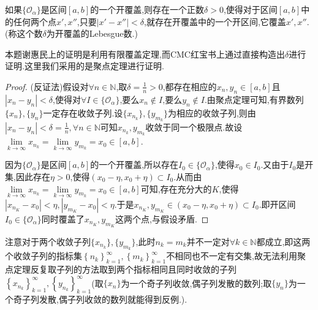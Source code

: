 \documentclass[../../main.tex]{subfiles}%
\begin{document}
\begin{lemma}[Lebesgue数引理]\label{lemma:Lebesgue数引理}
如果\(\{\mathcal{O}_{\alpha}\}\)是区间\([a,b]\)的一个开覆盖,则存在一个正数\(\delta>0\),使得对于区间\([a,b]\)中的任何两个点\(x',x''\),只要\(\vert x' - x''\vert<\delta\),就存在开覆盖中的一个开区间,它覆盖\(x',x''\).(称这个数\(\delta\)为开覆盖的Lebesgue数.)
\end{lemma}
\begin{note}
本题谢惠民上的证明是利用有限覆盖定理,而CMC红宝书上通过直接构造出$\delta$进行证明.这里我们采用的是聚点定理进行证明.
\end{note}
\begin{proof}
(反证法)假设对$\forall n\in\mathbb{N}$,取$\delta=\frac{1}{n}>0$,都存在相应的$x_n,y_n\in [a,b]$且$\left| x_n-y_n \right|<\delta$,使得对$\forall I\in\{\mathcal{O} _{\alpha}\}$,要么$x_n \notin I$,要么$y_n \notin I$.由聚点定理可知,有界数列$\{x_n\},\{y_n\}$一定存在收敛子列.设$\{x_{n_k}\},\{y_{m_k}\}$为相应的收敛子列,则由$\left| x_n-y_n \right|<\delta=\frac{1}{n},\forall n\in \mathbb{N}$可知${x_{n_k}},{y_{m_k}}$收敛于同一个极限点.故设$\underset{k\rightarrow \infty}{\lim}x_{n_k}=\underset{k\rightarrow \infty}{\lim}y_{m_k}=x_0\in[a,b]$.

因为\(\{\mathcal{O}_{\alpha}\}\)是区间\([a,b]\)的一个开覆盖,所以存在$I_0\in \{\mathcal{O}_{\alpha}\}$,使得$x_0 \in I_0$.又由于$I_0$是开集,因此存在$\eta>0$,使得$(x_0-\eta,x_0+\eta)\subset I_0$.从而由$\underset{k\rightarrow \infty}{\lim}x_{n_k}=\underset{k\rightarrow \infty}{\lim}y_{m_k}=x_0\in[a,b]$可知,存在充分大的$K$,使得$\left| x_{n_K}-x_0 \right|<\eta ,\left| y_{m_K}-x_0 \right|<\eta$.于是$x_{n_K},y_{m_K}\in \left( x_0-\eta ,x_0+\eta \right) \subset I_0$.即开区间$I_0\in \{\mathcal{O}_{\alpha}\}$同时覆盖了$x_{n_K},y_{m_K}$这两个点,与假设矛盾.
\end{proof}
\begin{remark}
注意对于两个收敛子列$\{x_{n_k}\},\{y_{m_k}\}$,此时$n_k = m_k$并不一定对$\forall k\in \mathbb{N}$都成立,即这两个收敛子列的指标集$\left\{ n_k \right\} _{k=1}^{\infty},\left\{ m_k \right\} _{k=1}^{\infty}$不相同也不一定有交集,故无法利用聚点定理反复取子列的方法取到两个指标相同且同时收敛的子列$\left\{ x_{n_k} \right\} _{k=1}^{\infty},\left\{ y_{n_k} \right\} _{k=1}^{\infty}$(取$\{x_n\}$为一个奇子列收敛,偶子列发散的数列;取$\{y_n\}$为一个奇子列发散,偶子列收敛的数列就能得到反例.).
\end{remark}
\end{document}
